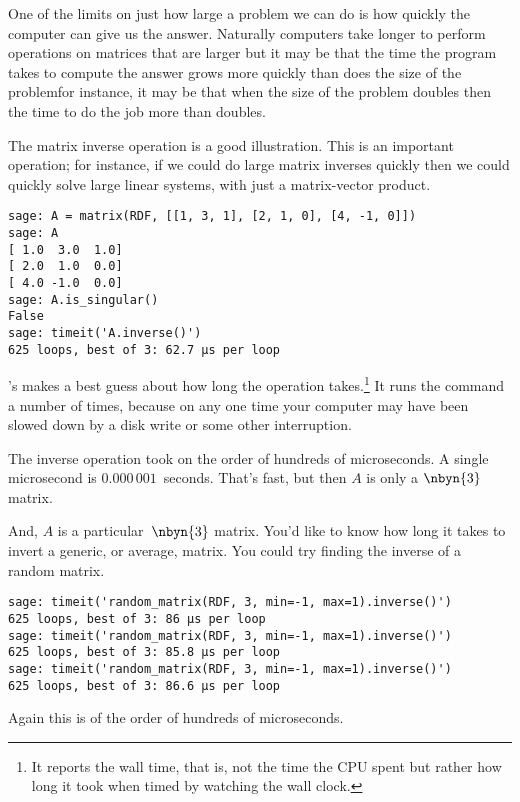 One of the limits on just how large a problem we can do is how quickly 
the computer can give us the answer.
Naturally computers take longer to perform operations 
on matrices that are larger
but it may be that the time the program takes to compute the answer
grows more quickly than does the size of the problem\Dash for instance, 
it may be that when the size of the problem doubles then the time to 
do the job more than doubles.

The matrix inverse operation is a good illustration.
This is an important operation; for instance, if we could do large matrix 
inverses
quickly then we could quickly solve large linear systems, 
with just a matrix-vector product.
\begin{lstlisting}
sage: A = matrix(RDF, [[1, 3, 1], [2, 1, 0], [4, -1, 0]])
sage: A
[ 1.0  3.0  1.0]
[ 2.0  1.0  0.0]
[ 4.0 -1.0  0.0]
sage: A.is_singular()
False
sage: timeit('A.inverse()')
625 loops, best of 3: 62.7 μs per loop
\end{lstlisting}
\noindent
\Sage's  makes a best guess about how long
the operation takes.\footnote{%
  It reports the wall time, that is, not the time the CPU
  spent but rather how long it took when timed
  by watching the wall clock.}
It runs the command 
a number of times, because on any one time your
computer may have been slowed down by a 
disk write or some other interruption.

The inverse operation took on the order of hundreds of microseconds.
A single microsecond is 
$0.000\,001$~seconds.
That's fast, but then $A$ is only a $\nbyn{3}$ matrix.

And, $A$ is a particular~$\nbyn{3}$ matrix. 
You'd like to know
how long it takes to invert a generic, or average, matrix.
You could try finding the inverse of a random matrix.
\begin{lstlisting}
sage: timeit('random_matrix(RDF, 3, min=-1, max=1).inverse()')
625 loops, best of 3: 86 μs per loop
sage: timeit('random_matrix(RDF, 3, min=-1, max=1).inverse()')
625 loops, best of 3: 85.8 μs per loop
sage: timeit('random_matrix(RDF, 3, min=-1, max=1).inverse()')
625 loops, best of 3: 86.6 μs per loop
\end{lstlisting}
\noindent
Again this is of the order of hundreds of microseconds.

